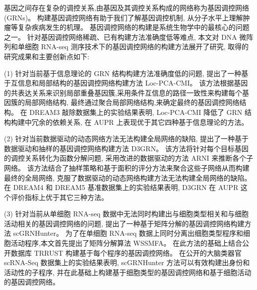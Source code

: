 \begin{abstractcn}\setlength{\baselineskip}{20pt}%

基因之间存在复杂的调控关系,由基因及其调控关系构成的网络称为基因调控网络 (GRNs)。
构建基因调控网络有助于我们了解基因调控机制,
从分子水平上理解肿瘤等复杂疾病发生的机理。
基因调控网络的构建是系统生物学中的最核心的问题之一。
针对基因调控网络稀疏、已有构建方法准确度低等难点, 
本文对 DNA 微阵列和单细胞 RNA-seq 测序技术下的基因调控网络的构建方法展开了研究,
取得的研究成果和主要创新点如下:

(1) 针对当前基于信息理论的 GRN 结构构建方法准确度低的问题,
提出了一种基于互信息和局部结构的基因调控网络构建方法 Loc-PCA-CMI。
该方法根据基因的共表达关系来识别局部重叠基因簇,采用条件互信息的路径一致性来构建每个基因簇的局部网络结构,
最终通过聚合局部网络结构,来确定最终的基因调控网络结构。
在 DREAM3 敲除数据集上的实验结果表明,
 Loc-PCA-CMI 降低了 GRN 结构构建中冗余的依赖关系,
在 AUPR 上表现优于其它四种基于信息理论的方法。

(2) 针对当前数据驱动的动态网络方法无法构建全局网络的缺陷,
提出了一种基于数据驱动和抽样的基因调控网络构建方法 D3GRN。
该方法将针对每个目标基因的调控关系转化为函数分解问题,
采用改进的数据驱动的方法 ARNI 来推断各个子网络。
该方法结合了抽样策略和基于面积的评分方法来聚合这些子网络从而构建最终的全局网络,
克服了数据驱动的动态网络构建方法无法构建全局网络的缺陷。
在 DREAM4 和 DREAM5 基准数据集上的实验结果表明,
 D3GRN 在 AUPR 这个评价指标上优于其它三种方法。


(3) 针对当前从单细胞 RNA-seq 数据中无法同时构建出与细胞类型相关和与细胞活动相关的基因调控网络的问题,
提出了一种基于矩阵分解的基因调控网络构建方法 scGRNHunter。
为了在单细胞 RNA-seq 数据上同时分离出细胞类型程序和细胞活动程序,本文首先提出了矩阵分解算法 WSSMFA。
在此方法的基础上结合公开数据库 TRRUST 构建基于每个程序的基因调控网络。
在公开的大脑类器官 scRNA-Seq 数据集上的实验结果表明,
scGRNHunter 方法可以有效构建出身份和活动性的子程序, 
并在此基础上构建基于细胞类型的基因调控网络和基于细胞活动的基因调控网络。



\end{abstractcn}
